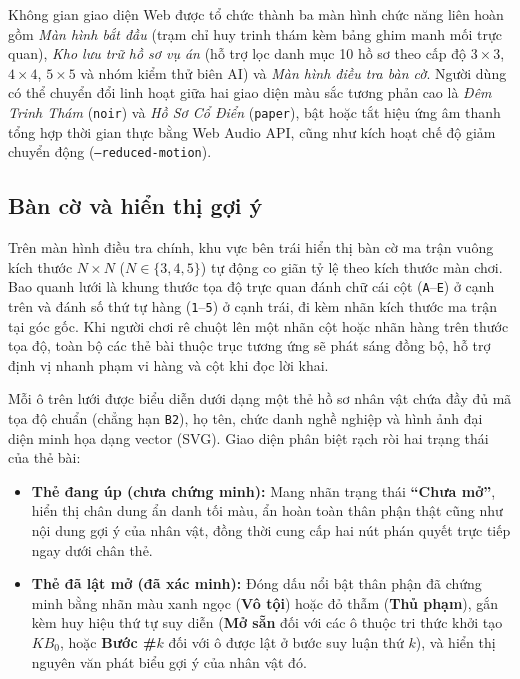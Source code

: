 Không gian giao diện Web được tổ chức thành ba màn hình chức năng liên hoàn gồm \emph{Màn hình bắt đầu} (trạm chỉ huy trinh thám kèm bảng ghim manh mối trực quan), \emph{Kho lưu trữ hồ sơ vụ án} (hỗ trợ lọc danh mục 10 hồ sơ theo cấp độ $3 \times 3$, $4 \times 4$, $5 \times 5$ và nhóm kiểm thử biên AI) và \emph{Màn hình điều tra bàn cờ}. Người dùng có thể chuyển đổi linh hoạt giữa hai giao diện màu sắc tương phản cao là \emph{Đêm Trinh Thám} (\texttt{noir}) và \emph{Hồ Sơ Cổ Điển} (\texttt{paper}), bật hoặc tắt hiệu ứng âm thanh tổng hợp thời gian thực bằng Web Audio API, cũng như kích hoạt chế độ giảm chuyển động (\texttt{--reduced-motion}).

\subsection{Bàn cờ và hiển thị gợi ý}
\label{subsec:ban-co-hien-thi}

Trên màn hình điều tra chính, khu vực bên trái hiển thị bàn cờ ma trận vuông kích thước $N \times N$ ($N \in \{3, 4, 5\}$) tự động co giãn tỷ lệ theo kích thước màn chơi. Bao quanh lưới là khung thước tọa độ trực quan đánh chữ cái cột (\texttt{A}--\texttt{E}) ở cạnh trên và đánh số thứ tự hàng (\texttt{1}--\texttt{5}) ở cạnh trái, đi kèm nhãn kích thước ma trận tại góc gốc. Khi người chơi rê chuột lên một nhãn cột hoặc nhãn hàng trên thước tọa độ, toàn bộ các thẻ bài thuộc trục tương ứng sẽ phát sáng đồng bộ, hỗ trợ định vị nhanh phạm vi hàng và cột khi đọc lời khai.

Mỗi ô trên lưới được biểu diễn dưới dạng một thẻ hồ sơ nhân vật chứa đầy đủ mã tọa độ chuẩn (chẳng hạn \texttt{B2}), họ tên, chức danh nghề nghiệp và hình ảnh đại diện minh họa dạng vector (SVG). Giao diện phân biệt rạch ròi hai trạng thái của thẻ bài:
\begin{itemize}
    \item \textbf{Thẻ đang úp (chưa chứng minh):} Mang nhãn trạng thái \textbf{``Chưa mở''}, hiển thị chân dung ẩn danh tối màu, ẩn hoàn toàn thân phận thật cũng như nội dung gợi ý của nhân vật, đồng thời cung cấp hai nút phán quyết trực tiếp ngay dưới chân thẻ.
    \item \textbf{Thẻ đã lật mở (đã xác minh):} Đóng dấu nổi bật thân phận đã chứng minh bằng nhãn màu xanh ngọc (\textbf{Vô tội}) hoặc đỏ thẫm (\textbf{Thủ phạm}), gắn kèm huy hiệu thứ tự suy diễn (\textbf{Mở sẵn} đối với các ô thuộc tri thức khởi tạo $KB_0$, hoặc \textbf{Bước \#$k$} đối với ô được lật ở bước suy luận thứ $k$), và hiển thị nguyên văn phát biểu gợi ý của nhân vật đó.
\end{itemize}

